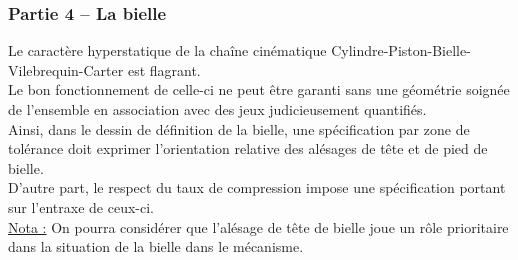 \subsubsection{Partie 4 -- La bielle}
Le caractère hyperstatique de la chaîne cinématique Cylindre-Piston-Bielle-Vilebrequin-Carter est flagrant.\\
Le bon fonctionnement de celle-ci ne peut être garanti sans une géométrie soignée de l'ensemble en association avec des jeux judicieusement quantifiés.\\
Ainsi, dans le dessin de définition de la bielle, une spécification par zone de tolérance doit exprimer l'orientation relative des alésages de tête et de pied de bielle.\\
D'autre part, le respect du taux de compression impose une spécification portant sur l'entraxe de ceux-ci.\\
\underline{Nota :} On pourra considérer que l'alésage de tête de bielle joue un rôle prioritaire dans la situation de la bielle dans le mécanisme.

